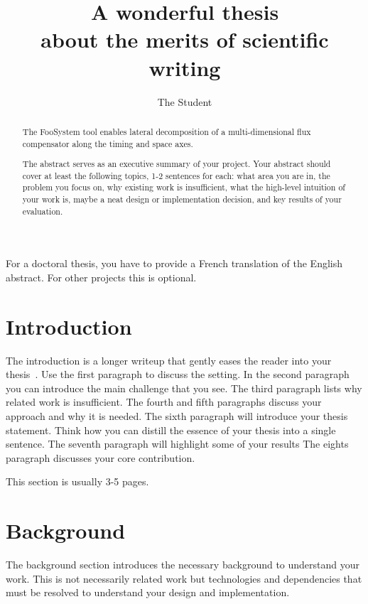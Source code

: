 \documentclass[a4paper,11pt,oneside]{report}
\title{A wonderful thesis\\about the merits of scientific writing}
\author{The Student}
\newcommand{\sysname}{FooSystem\xspace}
\begin{document}
\maketitle
\makededication
\makeacks

\begin{abstract}
The \sysname tool enables lateral decomposition of a multi-dimensional
flux compensator along the timing and space axes.

The abstract serves as an executive summary of your project.
Your abstract should cover at least the following topics, 1-2 sentences for
each: what area you are in, the problem you focus on, why existing work is
insufficient, what the high-level intuition of your work is, maybe a neat
design or implementation decision, and key results of your evaluation.
\end{abstract}

\begin{frenchabstract}
For a doctoral thesis, you have to provide a French translation of the
English abstract. For other projects this is optional.
\end{frenchabstract}

\maketoc

\chapter{Introduction}

The introduction is a longer writeup that gently eases the reader into your
thesis~\cite{dinesh20oakland}. Use the first paragraph to discuss the setting.
In the second paragraph you can introduce the main challenge that you see.
The third paragraph lists why related work is insufficient.
The fourth and fifth paragraphs discuss your approach and why it is needed.
The sixth paragraph will introduce your thesis statement. Think how you can
distill the essence of your thesis into a single sentence.
The seventh paragraph will highlight some of your results
The eights paragraph discusses your core contribution.

This section is usually 3-5 pages.

\chapter{Background}

The background section introduces the necessary background to understand your
work. This is not necessarily related work but technologies and dependencies
that must be resolved to understand your design and implementation.
\end{document}
